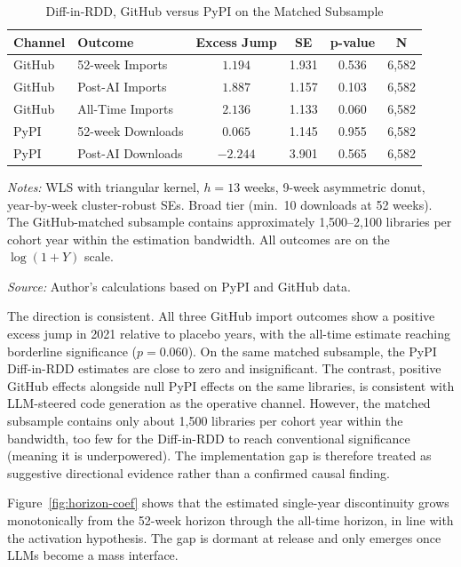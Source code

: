 \documentclass[12pt, a4paper]{report}
\begin{document}
\begin{table}[ht]
\centering
\caption{Diff-in-RDD, GitHub versus PyPI on the Matched Subsample}\label{tab:github-diffrdd}
\small
\begin{tabular}{llcccc}
\toprule
\textbf{Channel} & \textbf{Outcome} & \textbf{Excess Jump} & \textbf{SE} & \textbf{p-value} & \textbf{N} \\ \midrule
GitHub & 52-week Imports & $1.194$ & 1.931 & 0.536 & 6,582 \\
GitHub & Post-AI Imports & $1.887$ & 1.157 & 0.103 & 6,582 \\
GitHub & All-Time Imports & $2.136$ & 1.133 & 0.060 & 6,582 \\
\addlinespace
PyPI & 52-week Downloads & $0.065$ & 1.145 & 0.955 & 6,582 \\
PyPI & Post-AI Downloads & $-2.244$ & 3.901 & 0.565 & 6,582 \\ \bottomrule
\end{tabular}
\begin{tablenotes}
\small
\item \textit{Notes:} WLS with triangular kernel, $h = 13$ weeks, 9-week asymmetric donut, year-by-week cluster-robust SEs. Broad tier (min.\ 10 downloads at 52 weeks). The GitHub-matched subsample contains approximately 1,500--2,100 libraries per cohort year within the estimation bandwidth. All outcomes are on the $\log(1+Y)$ scale.
\item \textit{Source:} Author's calculations based on PyPI and GitHub data.
\end{tablenotes}
\end{table}

The direction is consistent. All three GitHub import outcomes show a positive excess jump in 2021 relative to placebo years, with the all-time estimate reaching borderline significance ($p = 0.060$). On the same matched subsample, the PyPI Diff-in-RDD estimates are close to zero and insignificant. The contrast, positive GitHub effects alongside null PyPI effects on the same libraries, is consistent with LLM-steered code generation as the operative channel. However, the matched subsample contains only about 1,500 libraries per cohort year within the bandwidth, too few for the Diff-in-RDD to reach conventional significance (meaning it is underpowered). The implementation gap is therefore treated as suggestive directional evidence rather than a confirmed causal finding.

Figure~\ref{fig:horizon-coef} shows that the estimated single-year discontinuity grows monotonically from the 52-week horizon through the all-time horizon, in line with the activation hypothesis. The gap is dormant at release and only emerges once LLMs become a mass interface.
\end{document}
